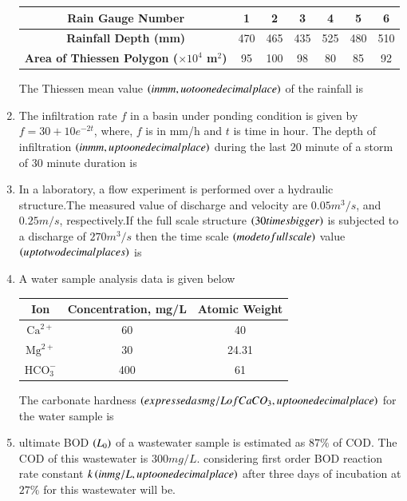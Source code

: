 \documentclass[journal]{IEEEtran}
\begin{document}
\begin{enumerate}
\begin{table}[h!]
\centering
\begin{tabular}{|c|c|c|c|c|c|c|}
\hline
\textbf{Rain Gauge Number} & 1 & 2 & 3 & 4 & 5 & 6 \\
\hline
\textbf{Rainfall Depth (mm)} & 470 & 465 & 435 & 525 & 480 & 510 \\
\hline
\textbf{Area of Thiessen Polygon ($\times 10^4$ m$^2$)} & 95 & 100 & 98 & 80 & 85 & 92 \\
\hline
\end{tabular}
\end{table}
The Thiessen mean value $\left(in mm, uo to one decimal place\right)$ of the rainfall is\\
\item The infiltration rate $f$ in a basin under ponding condition is given by $f=30+10e^{-2t}$,
where, $f$ is in mm/h and $t$ is time in hour. The depth of infiltration $\left(in mm, up to one decimal place\right)$ during the last $20$ minute of a storm of $30$ minute duration is\\
\item In a laboratory, a flow experiment is performed over a hydraulic structure.The measured value of discharge and velocity are  $0.05 m^{3}/s$, and $0.25 m/s$, respectively.If the full scale structure $\left(30 times bigger\right)$ is subjected to a discharge of $270 m^{3}/s$ then the time scale $\left(mode to full scale\right)$ value $\left(up to two decimal places\right)$ is\\
\item A water sample analysis data is given below\\
\begin{table}[h!]
    \centering
    \begin{tabular}{|c|c|c|}
        \hline
        \textbf{Ion} & \textbf{Concentration, mg/L} & \textbf{Atomic Weight} \\
        \hline
        $\text{Ca}^{2+}$ & 60 & 40 \\
        \hline
        $\text{Mg}^{2+}$ & 30 & 24.31 \\
        \hline
        $\text{HCO}_{3}^{-}$ & 400 & 61 \\
        \hline
    \end{tabular}
\end{table}
The carbonate hardness $\left(expressed as mg/L of CaCO_{3}, up to one decimal place\right)$ for the water sample is\\
\item ultimate BOD $\left(L_{0}\right)$ of a wastewater sample is estimated as $87\%$ of COD. The COD of this wastewater is $300 mg/L$. considering first order BOD reaction rate constant $k \left(in mg/L, up to one decimal place\right)$ after three days of incubation at $27\%$ for this wastewater will be.









 
 \end{enumerate}
\end{document}
